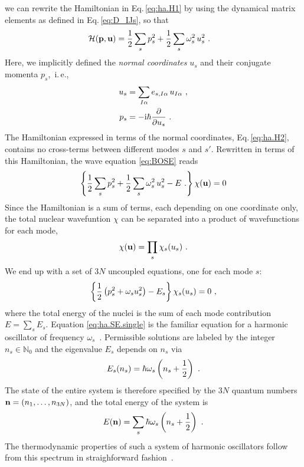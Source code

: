 we can rewrite the Hamiltonian in Eq.\,\eqref{eq:ha.H1} by using the dynamical matrix elements as defined in Eq.\,\eqref{eq:D_IJs}, so that
\begin{align}
	\mathcal{H}( {\bf p},  {\bf u})
		&= \frac{1}{2} \sum_s p_s^2 + 
		\frac{1}{2} \sum_{s} \omega_s^2	\, u_s^2~.
\label{eq:ha.H2}
\end{align}
Here, we implicitly defined the \emph{normal coordinates} $u_s$ and their conjugate momenta $p_s$,~i.\,e.,
\begin{align}
	u_s
		&= \sum_{I \alpha} e_{s, I \alpha} \, u_{I \alpha}~,
		\label{eq:u_s} \\
	p_s
		&= -{\rm i} \hbar \frac{\partial}{\partial u_s}~.
		\label{eq:p_s}
\end{align}
The Hamiltonian expressed in terms of the normal coordinates, Eq.\,\eqref{eq:ha.H2}, contains no cross-terms between different modes $s$ and $s'$. Rewritten in terms of this Hamiltonian, the wave equation \eqref{eq:BOSE} reads
\begin{align}
	\left\{
		\frac{1}{2} \sum_s p_s^2 + \frac{1}{2} \sum_{s} \omega_s^2	\, u_s^2 - E~.
	\right\} \chi ({\bf u})
	= 0
	\label{eq:ha.SE.2}
\end{align}
Since the Hamiltonian is a sum of terms, each depending on one coordinate only, the total nuclear wavefuntion $\chi$ can be separated into a product of wavefunctions for each mode,
\begin{align}
	\chi({\bf u}) = \prod_{s} \chi_s (u_s)~.
	\label{eq:ha.chi}
\end{align}
We end up with a set of $3N$ uncoupled equations, one for each mode $s$:
\begin{align}
	\left\{	\frac{1}{2} \left( p_s^2 + \omega_s u_s^2 \right)	- E_s	\right\} \chi_s (u_s)
		= 0~,
	\label{eq:ha.SE.single}
\end{align}
where the total energy of the nuclei is the sum of each mode contribution $E = \sum_s E_s$. Equation \eqref{eq:ha.SE.single} is the familiar equation for a harmonic oscillator of frequency $\omega_s$~\cite{Dirac1981}. Permissible solutions are labeled by the integer $n_s \in \mathds N_0$ and the eigenvalue $E_s$ depends on $n_s$ via
\begin{align}
	E_s(n_s) = \hbar \omega_s \left( n_s + \frac{1}{2} \right)~.
	\label{eq:E_s}
\end{align}
The state of the entire system is therefore specified by the $3N$ quantum numbers ${\bf n} = (n_1, \ldots, n_{3N})$, and the total energy of the system is
\begin{align}
	E ({\bf n}) = \sum_s \hbar \omega_s \left( n_s + \frac{1}{2} \right)~.
\end{align}
The thermodynamic properties of such a system of harmonic oscillators follow from this spectrum in straighforward fashion~\cite{BornHuang}.

